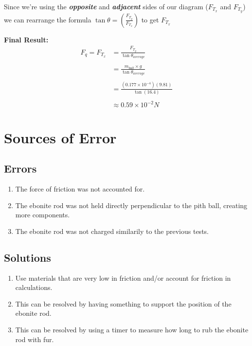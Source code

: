\documentclass{article}
\begin{document}
\vspace*{0.3cm}
\noindent Since we're using the \textbf{\textit{opposite}} and \textbf{\textit{adjacent}} sides of our diagram
($F_{T_{x}}$ and $F_{T_{y}}$) we can rearrange the formula $\tan\theta = \left(\frac{F_{T_{y}}}{F_{T_{x}}}\right)$
to get $F_{T_{x}}$\newline


\noindent\textbf{Final Result:}
\begin{align*}
    F_{q} = F_{T_{x}} & = \frac{F_{T_{y}}}{\tan\theta_{average}}          \\\\
                      & = \frac{m_{ball} \times g}{\tan\theta_{average}}  \\\\
                      & = \frac{(0.177 \times 10^{-4})(9.81)}{\tan(16.4)} \\\\
                      & \approx 0.59 \times 10^{-2}N
\end{align*}


\section*{Sources of Error}
\subsection*{Errors}
\begin{enumerate}
    \item {The force of friction was not accounted for.}
    \item {The ebonite rod was not held directly perpendicular to the pith ball, creating more components.}
    \item {The ebonite rod was not charged similarily to the previous tests.}
\end{enumerate}
\subsection*{Solutions}
\begin{enumerate}
    \item {Use materials that are very low in friction and/or account for friction in calculations.}
    \item {This can be resolved by having something to support the position of the ebonite rod.}
    \item {This can be resolved by using a timer to measure how long to rub the ebonite rod with fur.}
\end{enumerate}\leavevmode
\end{document}
